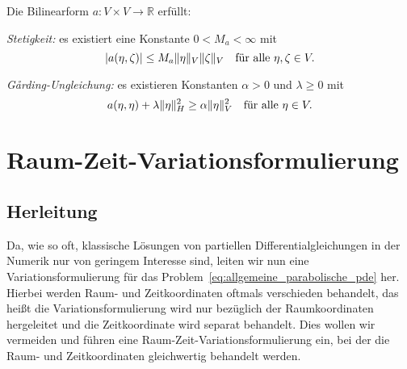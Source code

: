 \begin{Annahme}
\label{annahme:eigenschaften_bf_a}
    Die Bilinearform $a \colon V \times V \to \mathbb{R}$ erfüllt:
    \begin{thmenumerate}
        \item \emph{Stetigkeit:} es existiert eine Konstante $0 < M_{a} < \infty$ mit
        \begin{equation}
            \label{eq:allgemeine_parabolische_pde:bf_stetig}
            \lvert a(\eta, \zeta)\rvert \leq M_{a} \lVert\eta\rVert_{V} \lVert\zeta\rVert_{V} \quad \text{für alle}~\eta, \zeta \in V.
        \end{equation}
        \item \emph{G\r{a}rding-Ungleichung:} es existieren Konstanten $\alpha > 0$ und $\lambda \geq 0$ mit
        \begin{equation}
            \label{eq:allgemeine_parabolische_pde:bf_garding}
            a(\eta, \eta) + \lambda \lVert\eta\rVert_{H}^{2} \geq \alpha \lVert\eta\rVert_{V}^{2} \quad \text{für alle}~\eta \in V.
        \end{equation}
    \end{thmenumerate}
\end{Annahme}


\section{Raum-Zeit-Variationsformulierung} %
\label{sec:raum_zeit_variationsformulierung}

\subsection{Herleitung} %
\label{sub:herleitung}

Da, wie so oft, klassische Lösungen von partiellen Differentialgleichungen in der Numerik nur von geringem Interesse sind, leiten wir nun eine Variationsformulierung für das Problem~\eqref{eq:allgemeine_parabolische_pde} her.
Hierbei werden Raum- und Zeitkoordinaten oftmals verschieden behandelt, das heißt die Variationsformulierung wird nur bezüglich der Raumkoordinaten hergeleitet und die Zeitkoordinate wird separat behandelt.
Dies wollen wir vermeiden und führen eine Raum-Zeit-Variationsformulierung ein, bei der die Raum- und Zeitkoordinaten gleichwertig behandelt werden.

